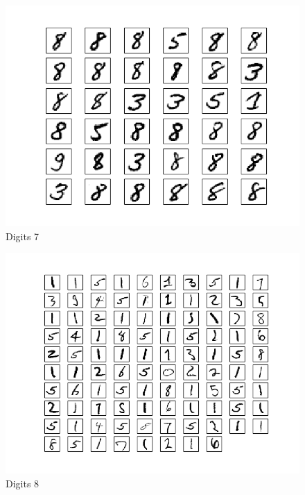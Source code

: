 \documentclass[10pt]{article}
\begin{document}
\begin{figure}
\begin{center}
\includegraphics[scale=0.5]{meansA7}
\caption{Digits 7}
\end{center}
\end{figure}
\begin{figure}
\begin{center}
\includegraphics[scale=0.5]{meansA8}
\caption{Digits 8}
\end{center}
\end{figure}
\end{document}
